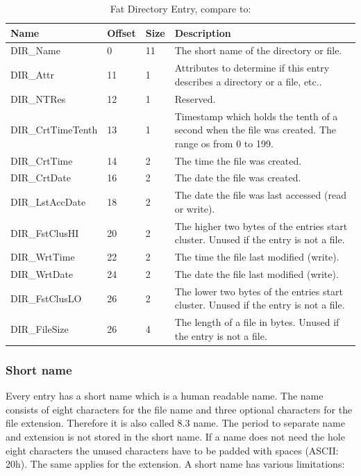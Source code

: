 \begin{table}[!ht]
\caption{Fat Directory Entry, compare to: \cite{usb_ms_jan, fatgen103}}
\centering
\begin{tabular}{|l|l|l|p{8.5cm}|}
\hline\hline
\textbf{Name} & \textbf{Offset} & \textbf{Size} & \textbf{Description}\\ \hline
DIR\_Name & 0 & 11 & The short name of the directory or file. \\ \hline
DIR\_Attr & 11 & 1 & Attributes to determine if this entry describes a directory or a file, etc.. \\ \hline
DIR\_NTRes & 12 & 1 & Reserved. \\ \hline
DIR\_CrtTimeTenth & 13 & 1 & Timestamp which holds the tenth of a second when the file was created. The range os from 0 to 199. \\ \hline
DIR\_CrtTime & 14 & 2 & The time the file was created. \\ \hline
DIR\_CrtDate & 16 & 2 & The date the file was created. \\ \hline
DIR\_LstAccDate & 18 & 2 & The date the file was last accessed (read or write). \\ \hline
DIR\_FstClusHI & 20 & 2 & The higher two bytes of the entries start cluster. Unused if the entry is not a file. \\ \hline
DIR\_WrtTime & 22 & 2 & The time the file last modified (write). \\ \hline
DIR\_WrtDate & 24 & 2 & The date the file last modified (write). \\ \hline
DIR\_FstClusLO & 26 & 2 & The lower two bytes of the entries start cluster. Unused if the entry is not a file. \\ \hline
DIR\_FileSize & 26 & 4 & The length of a file in bytes. Unused if the entry is not a file. \\ \hline
\end{tabular}
\label{table:fat_dir_entry}
\end{table}

\subsubsection{Short name}

Every entry has a short name which is a human readable name. The name consists of eight characters for the file name and three optional characters for the file extension. Therefore it is also called 8.3 name. The period to separate name and extension is not stored in the short name. If a name does not need the hole eight characters the unused characters have to be padded with spaces (ASCII: 20h). The same applies for the extension. A short name has various limitations\cite{usb_ms_jan}:

